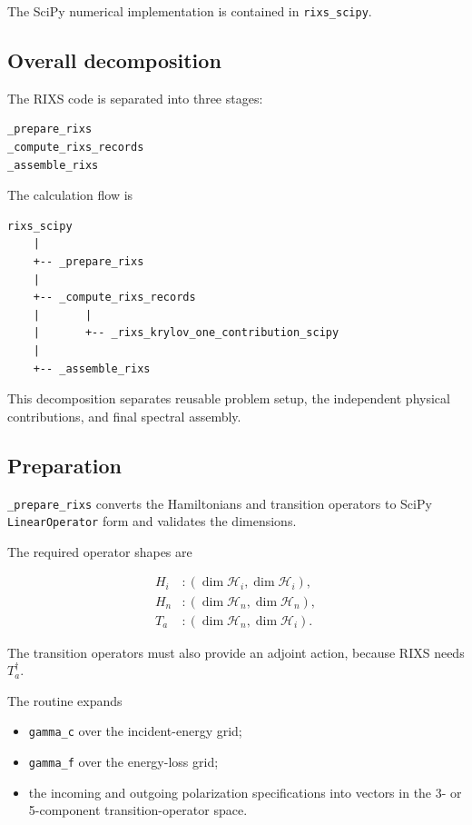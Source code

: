 \documentclass[11pt]{article}
\begin{document}
The SciPy numerical implementation is contained in \texttt{rixs\_scipy}.

\subsection{Overall decomposition}

The RIXS code is separated into three stages:

\begin{lstlisting}
_prepare_rixs
_compute_rixs_records
_assemble_rixs
\end{lstlisting}

The calculation flow is

\begin{lstlisting}
rixs_scipy
    |
    +-- _prepare_rixs
    |
    +-- _compute_rixs_records
    |       |
    |       +-- _rixs_krylov_one_contribution_scipy
    |
    +-- _assemble_rixs
\end{lstlisting}

This decomposition separates reusable problem setup, the independent physical contributions, and final spectral assembly.

\subsection{Preparation}

\texttt{\_prepare\_rixs} converts the Hamiltonians and transition operators to SciPy \texttt{LinearOperator} form and validates the dimensions.

The required operator shapes are

\begin{align}
  H_i &: (\dim\mathcal H_i,\dim\mathcal H_i),\\
  H_n &: (\dim\mathcal H_n,\dim\mathcal H_n),\\
  T_a &: (\dim\mathcal H_n,\dim\mathcal H_i).
\end{align}

The transition operators must also provide an adjoint action, because RIXS needs \(T_a^\dagger\).

The routine expands

\begin{itemize}
  \item \texttt{gamma\_c} over the incident-energy grid;
  \item \texttt{gamma\_f} over the energy-loss grid;
  \item the incoming and outgoing polarization specifications into vectors in the 3- or 5-component transition-operator space.
\end{itemize}
\end{document}
